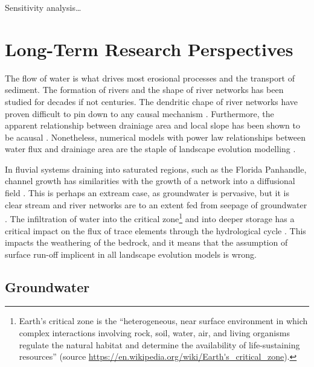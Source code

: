 Sensitivity analysis\dots
  

\section{Long-Term Research Perspectives}

The flow of water is what drives most erosional processes and the transport of sediment. The formation of rivers and the shape of river networks has been studied for decades if not centuries. The dendritic chape of river networks have proven difficult to pin down to any causal mechanism \citep[e.g.][]{dodds-2000a}. Furthermore, the apparent relationship between drainiage area and local slope has been shown to be acausal \citep{schorghofer-2002}. Nonetheless, numerical models with power law relationships between water flux and drainiage area are the staple of landscape evolution modelling \citep[e.g. my own work][]{armitage-2019}.

In fluvial systems draining into saturated regions, such as the Florida Panhandle, channel growth has similarities with the growth of a network into a diffusional field \citep{devauchelle-etal-2012}. This is perhaps an extream case, as groundwater is pervasive, but it is clear stream and river networks are to an extent fed from seepage of groundwater \citep[e.g.][]{fan-etal-2019}. The infiltration of water into the critical zone\footnote{Earth's critical zone is the “heterogeneous, near surface environment in which complex interactions involving rock, soil, water, air, and living organisms regulate the natural habitat and determine the availability of life-sustaining resources” (source \url{https://en.wikipedia.org/wiki/Earth's_critical_zone}).} and into deeper storage has a critical impact on the flux of trace elements through the hydrological cycle \citep[e.g.][]{condon-etal-2020}. This impacts the weathering of the bedrock, and it means that the assumption of surface run-off implicent in all landscape evolution models is wrong.

\subsection{Groundwater}

